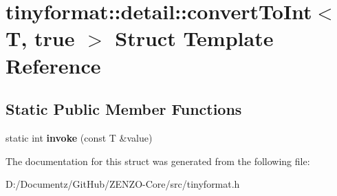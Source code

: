 \hypertarget{structtinyformat_1_1detail_1_1convert_to_int_3_01_t_00_01true_01_4}{}\section{tinyformat\+::detail\+::convert\+To\+Int$<$ T, true $>$ Struct Template Reference}
\label{structtinyformat_1_1detail_1_1convert_to_int_3_01_t_00_01true_01_4}
\subsection*{Static Public Member Functions}
\begin{DoxyCompactItemize}
\item 
\mbox{\label{structtinyformat_1_1detail_1_1convert_to_int_3_01_t_00_01true_01_4_a7d03793b995eb4428bb13349004f5fcd}} 
static int {\bfseries invoke} (const T \&value)
\end{DoxyCompactItemize}


The documentation for this struct was generated from the following file\+:\begin{DoxyCompactItemize}
\item 
D\+:/\+Documentz/\+Git\+Hub/\+Z\+E\+N\+Z\+O-\/\+Core/src/tinyformat.\+h\end{DoxyCompactItemize}
